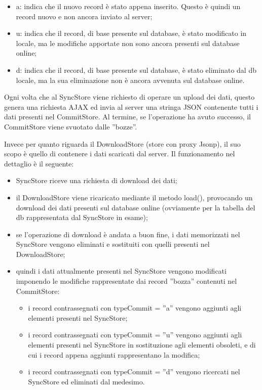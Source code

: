 \documentclass[10pt,a4paper,onecolumn]{article}
\begin{document}
\begin{itemize}
	\item a: indica che il nuovo record è stato appena inserito. Questo è quindi un record nuovo e non ancora inviato al server;
	\item u: indica che il record, di base presente sul database, è stato modificato in locale, ma le modifiche apportate non sono ancora presenti sul database online;
	\item d: indica che il record, di base presente sul database, è stato eliminato dal db locale, ma la sua eliminazione non è ancora avvenuta sul database online.
\end{itemize}

Ogni volta che al SyncStore viene richiesto di operare un upload dei dati, questo genera una richiesta AJAX ed invia al server una stringa JSON contenente tutti i dati presenti nel CommitStore. Al termine, se l'operazione ha avuto successo, il CommitStore viene svuotato dalle ''bozze''.

Invece per quanto riguarda il DownloadStore (store con proxy Jsonp), il suo scopo è quello di contenere i dati scaricati dal server. Il funzionamento nel dettaglio è il seguente:
\begin{itemize}
	\item SyncStore riceve una richiesta di download dei dati;
	\item il DownloadStore viene ricaricato mediante il metodo load(), provocando un download dei dati presenti sul database online (ovviamente per la tabella del db rappresentata dal SyncStore in esame);
	\item se l'operazione di download è andata a buon fine, i dati memorizzati nel SyncStore vengono eliminati e sostituiti con quelli presenti nel DownloadStore;
	\item quindi i dati attualmente presenti nel SyncStore vengono modificati imponendo le modifiche rappresentate dai record ''bozza'' contenuti nel CommitStore:
		\begin{itemize}
			\item i record contrassegnati con typeCommit = ''a'' vengono aggiunti agli elementi presenti nel SyncStore;
			\item i record contrassegnati con typeCommit = ''u'' vengono aggiunti agli elementi presenti nel SyncStore in sostituzione agli elementi obsoleti, e di cui i record appena aggiunti rappresentano la modifica;
			\item i record contrassegnati con typeCommit = ''d'' vengono ricercati nel SyncStore ed eliminati dal medesimo.
		\end{itemize}
\end{itemize}
\end{document}
